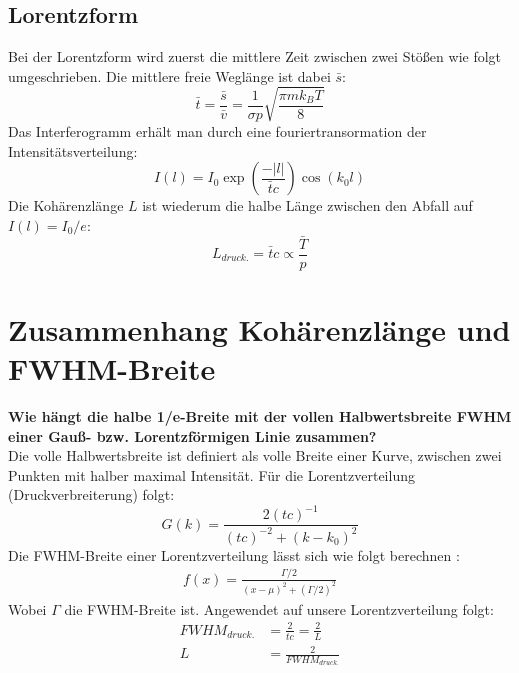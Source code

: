 \subsection{Lorentzform}
Bei der Lorentzform wird zuerst die mittlere Zeit zwischen zwei Stößen wie folgt umgeschrieben.
Die mittlere freie Weglänge ist dabei $\bar{s}$:
\begin{equation}
    \bar{t}=\frac{\bar{s}}{\bar{v}}=\frac{1}{\sigma p}\sqrt{\frac{\pi m k_B T}{8}}
\end{equation}
Das Interferogramm erhält man durch eine fouriertransormation der Intensitätsverteilung:
\begin{equation}
    I(l)=I_0\exp\left(\frac{-\left|l\right|}{\bar{t}c}\right)\cos(k_0l)
\end{equation}
Die Kohärenzlänge $L$ ist wiederum die halbe Länge zwischen den Abfall auf $I(l)=I_0/e$:
\begin{equation}
    L_{druck.}=\bar{t}c\propto\frac{\bar{T}}{p}
\end{equation}\newpage
\section{Zusammenhang Kohärenzlänge und FWHM-Breite}
\textbf{Wie hängt die halbe 1/e-Breite mit der vollen Halbwertsbreite FWHM einer Gauß- bzw. Lorentzförmigen Linie zusammen?}\\

Die volle Halbwertsbreite ist definiert als volle Breite einer Kurve, zwischen zwei Punkten mit halber maximal Intensität.
Für die Lorentzverteilung (Druckverbreiterung) folgt:
\begin{equation}
    G(k)=\frac{2(tc)^{-1}}{(tc)^{-2}+\left(k-k_0\right)^2}
\end{equation}
Die FWHM-Breite einer Lorentzverteilung lässt sich wie folgt berechnen \citep[vgl.]{FWHM-Lorentz}:
\begin{align}
    f(x)=\frac{\Gamma/2}{\left(x-\mu\right)^2+\left(\Gamma/2\right)^2}
\end{align}
Wobei $\Gamma$ die FWHM-Breite ist.
Angewendet auf unsere Lorentzverteilung folgt:
\begin{align}
    FWHM_{druck.}&=\frac{2}{tc}=\frac{2}{L}\\
    L&=\frac{2}{FWHM_{druck.}}
\end{align}

